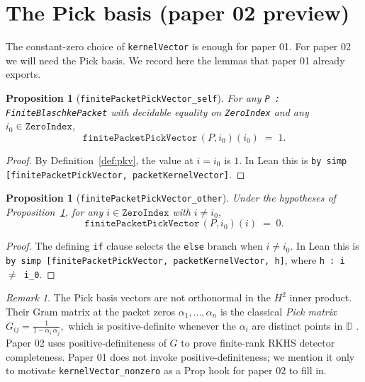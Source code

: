 \documentclass[11pt]{article}
\theoremstyle{plain}
\newtheorem{proposition}[theorem]{Proposition}
\theoremstyle{definition}
\theoremstyle{remark}
\newtheorem{remark}[theorem]{Remark}
\newcommand{\HtH}{H^{2}}
\newcommand{\D}{\mathbb{D}}
\newcommand{\conj}[1]{\overline{#1}}
\newcommand{\code}[1]{\texttt{#1}}
\begin{document}
\section{The Pick basis (paper 02 preview)}\label{sec:pick}

The constant-zero choice of \code{kernelVector} is enough for paper 01.
For paper 02 we will need the Pick basis.  We record here the lemmas that
paper 01 already exports.

\begin{proposition}[\code{finitePacketPickVector\_self}]\label{prop:pick-self}
For any \code{P : FiniteBlaschkePacket} with decidable equality on
\code{ZeroIndex} and any $i_{0}\in\code{ZeroIndex}$,
\[
   \code{finitePacketPickVector}\,(P,i_{0})(i_{0}) \;=\; 1.
\]
\end{proposition}

\begin{proof}
By Definition~\ref{def:pkv}, the value at $i=i_{0}$ is $1$.  In Lean this is
\code{by simp [finitePacketPickVector, packetKernelVector]}.
\end{proof}

\begin{proposition}[\code{finitePacketPickVector\_other}]\label{prop:pick-other}
Under the hypotheses of Proposition~\ref{prop:pick-self}, for any
$i\in\code{ZeroIndex}$ with $i \ne i_{0}$,
\[
   \code{finitePacketPickVector}\,(P,i_{0})(i) \;=\; 0.
\]
\end{proposition}

\begin{proof}
The defining \code{if} clause selects the \code{else} branch when
$i\ne i_{0}$.  In Lean this is
\code{by simp [finitePacketPickVector, packetKernelVector, h]}, where
\code{h : i \(\ne\) i\_0}.
\end{proof}

\begin{remark}\label{rem:gram}
The Pick basis vectors are not orthonormal in the $\HtH$ inner product.
Their Gram matrix at the packet zeros $\alpha_{1},\dots,\alpha_{n}$ is the
classical \emph{Pick matrix}
\(
   G_{ij} = \frac{1}{1 - \alpha_{i}\,\conj{\alpha_{j}}},
\)
which is positive-definite whenever the $\alpha_{i}$ are distinct points in
$\D$ \cite{agler-mccarthy}.  Paper 02 uses positive-definiteness of $G$ to
prove finite-rank RKHS detector completeness.  Paper 01 does not invoke
positive-definiteness; we mention it only to motivate
\code{kernelVector\_nonzero} as a Prop hook for paper 02 to fill in.
\end{remark}
\end{document}
